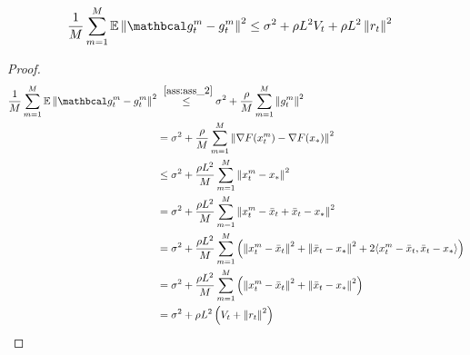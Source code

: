 



\begin{lemma} \label{lem:rho_2}
    \begin{align}
        \frac{1}{M} \summ{m=1}{M} \E \norm{\mc{g}^m_t - g^m_t}^2
        &\leq
        \sigma^2 + \rho L^2 V_t + \rho L^2 \norm{r_t}^2
    \end{align}
\end{lemma}
\begin{proof}
    \begin{align}
        \frac{1}{M} \summ{m=1}{M} \E \norm{\mc{g}^m_t - g^m_t}^2
        &\overset{~\ref{ass:ass_2}}{\leq}
        \sigma^2 + \frac{\rho}{M} \summ{m=1}{M} \norm {g^m_t}^2 \\
        &=
        \sigma^2 + \frac{\rho}{M} \summ{m=1}{M} \norm {\nabla F(x^m_t) - \nabla F(x_*)}^2 \\
        &\leq
        \sigma^2 + \frac{\rho L^2}{M} \summ{m=1}{M} \norm{x^m_t - x_*}^2 \\
        &=
        \sigma^2 + \frac{\rho L^2}{M} \summ{m=1}{M} \norm{x^m_t - \bar{x}_t + \bar{x}_t - x_*}^2 \\
        &=
        \sigma^2 + \frac{\rho L^2}{M} \summ{m=1}{M} \left( \norm{x^m_t - \bar{x}_t}^2
        + \norm{\bar{x}_t - x_*}^2 + 2\inner{x^m_t - \bar{x}_t}{\bar{x}_t - x_*} \right) \\
        &=
        \sigma^2 + \frac{\rho L^2}{M} \summ{m=1}{M} \left( \norm{x^m_t - \bar{x}_t}^2
        + \norm{\bar{x}_t - x_*}^2 \right) \\
        &= \sigma^2 + \rho L^2 \left( V_t + \norm{r_t}^2 \right)
    \end{align}
\end{proof}




